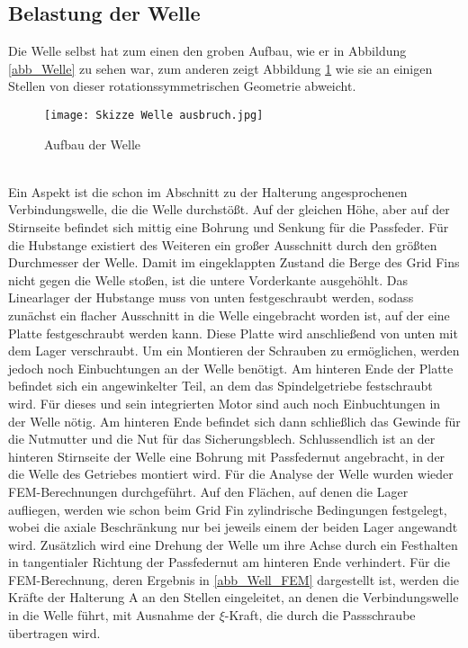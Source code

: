 \subsection{Belastung der Welle}
Die Welle selbst hat zum einen den groben Aufbau, wie er in Abbildung \ref{abb_Welle} zu sehen war, zum anderen zeigt Abbildung \ref{abb_aufbau_Welle} wie sie an einigen Stellen von dieser rotationssymmetrischen Geometrie abweicht.
\begin{figure}[h] 
	\centering
	\texttt{[image: Skizze Welle ausbruch.jpg]}
	\caption{Aufbau der Welle}
	\label{abb_aufbau_Welle}
\end{figure}\\
 Ein Aspekt ist die schon im Abschnitt zu der Halterung angesprochenen Verbindungswelle, die die Welle durchstößt. Auf der gleichen Höhe, aber auf der Stirnseite befindet sich mittig eine Bohrung und Senkung für die Passfeder. Für die Hubstange existiert des Weiteren ein großer Ausschnitt durch den größten Durchmesser der Welle. Damit im eingeklappten Zustand die Berge des Grid Fins nicht gegen die Welle stoßen, ist die untere Vorderkante ausgehöhlt. Das Linearlager der Hubstange muss von unten festgeschraubt werden, sodass zunächst ein flacher Ausschnitt in die Welle eingebracht worden ist, auf der eine Platte festgeschraubt werden kann. Diese Platte wird anschließend von unten mit dem Lager verschraubt. Um ein Montieren der Schrauben zu ermöglichen, werden jedoch noch Einbuchtungen an der Welle benötigt. Am hinteren Ende der Platte befindet sich ein angewinkelter Teil, an dem das Spindelgetriebe festschraubt wird.
Für dieses und sein integrierten Motor sind auch noch Einbuchtungen in der Welle nötig. Am hinteren Ende befindet sich dann schließlich das Gewinde für die Nutmutter und die Nut für das Sicherungsblech. Schlussendlich ist an der hinteren Stirnseite der Welle eine Bohrung mit Passfedernut angebracht, in der die Welle des Getriebes montiert wird.
Für die Analyse der Welle wurden wieder FEM-Berechnungen durchgeführt. Auf den Flächen, auf denen die Lager aufliegen, werden wie schon beim Grid Fin zylindrische Bedingungen festgelegt, wobei die axiale Beschränkung nur bei jeweils einem der beiden Lager angewandt wird. Zusätzlich wird eine Drehung der Welle um ihre Achse durch ein Festhalten in tangentialer Richtung der Passfedernut am hinteren Ende verhindert.
Für die FEM-Berechnung, deren Ergebnis in \ref{abb_Well_FEM} dargestellt ist, werden die Kräfte der Halterung A an den Stellen eingeleitet, an denen die Verbindungswelle in die Welle führt, mit Ausnahme der $\xi$-Kraft, die durch die Passschraube übertragen wird. 
